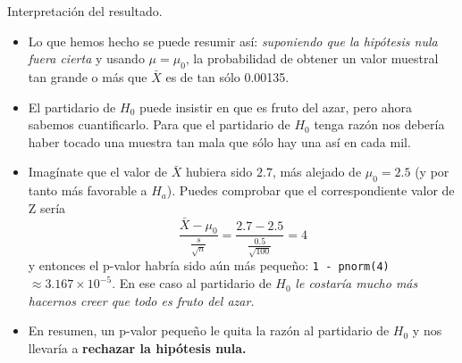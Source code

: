 \documentclass[
  9pt,
  ignorenonframetext,
]{beamer}
\begin{document}
\begin{frame}[fragile]{Interpretación del resultado.}
\protect\hypertarget{interpretacion-del-resultado.}{}

\begin{itemize}
\item
  Lo que hemos hecho se puede resumir así: \emph{suponiendo que la
  hipótesis nula fuera cierta} y usando \(\mu = \mu_0\), la probabilidad
  de obtener un valor muestral tan grande o más que \(\bar X\) es de tan
  sólo 0.00135.
\item
  El partidario de \(H_0\) puede insistir en que es fruto del azar, pero
  ahora sabemos cuantificarlo. Para que el partidario de \(H_0\) tenga
  razón nos debería haber tocado una muestra tan mala que sólo hay una
  así en cada mil.
\item
  Imagínate que el valor de \(\bar X\) hubiera sido \(2.7\), más alejado
  de \(\mu_0 = 2.5\) (y por tanto más favorable a \(H_a\)). Puedes
  comprobar que el correspondiente valor de Z sería \[
  \dfrac{\bar X - \mu_0}{\frac{s}{\sqrt{n}}} = 
  \dfrac{2.7 - 2.5}{\frac{0.5}{\sqrt{100}}} = 4
  \] y entonces el p-valor habría sido aún más pequeño:
  \texttt{1\ -\ pnorm(4)} \(\approx \ensuremath{3.167\times 10^{-5}}\).
  En ese caso al partidario de \(H_0\) \emph{le costaría mucho más
  hacernos creer que todo es fruto del azar.}
\item
  En resumen, un p-valor pequeño le quita la razón al partidario de
  \(H_0\) y nos llevaría a \textbf{rechazar la hipótesis nula.}
\end{itemize}

\end{frame}
\end{document}
